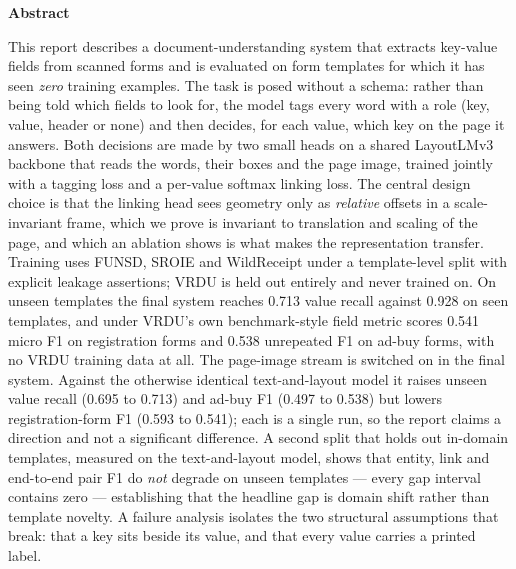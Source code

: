 \documentclass[11pt,a4paper]{article}
\begin{document}
\begin{center}
\begin{minipage}{0.86\textwidth}
\begin{center}\textbf{Abstract}\end{center}
\small
This report describes a document-understanding system that extracts key-value fields from
scanned forms and is evaluated on form templates for which it has seen \emph{zero} training
examples. The task is posed without a schema: rather than being told which fields to look for,
the model tags every word with a role (key, value, header or none) and then decides, for each
value, which key on the page it answers. Both decisions are made by two small heads on a shared LayoutLMv3 backbone that reads the words,
their boxes and the page image, trained jointly with a tagging loss and a per-value softmax
linking loss.
The central design choice is that the linking head sees geometry only as \emph{relative}
offsets in a scale-invariant frame, which we prove is invariant to translation and scaling of
the page, and which an ablation shows is what makes the representation transfer. Training uses
FUNSD, SROIE and WildReceipt under a template-level split with explicit leakage assertions;
VRDU is held out entirely and never trained on. On unseen templates the final system reaches
0.713 value recall against 0.928 on seen templates, and under VRDU's own benchmark-style field
metric scores 0.541 micro F1 on registration forms and 0.538 unrepeated F1 on ad-buy forms, with
no VRDU training data at all. The page-image stream is switched on in the final system. Against
the otherwise identical text-and-layout model it raises unseen value recall (0.695 to 0.713) and
ad-buy F1 (0.497 to 0.538) but lowers registration-form F1 (0.593 to 0.541); each is a single run,
so the report claims a direction and not a significant difference. A second split that holds out
in-domain templates, measured on the text-and-layout model, shows that entity, link and
end-to-end pair F1 do \emph{not} degrade on unseen templates --- every gap interval contains zero
--- establishing that the headline gap is domain shift rather than template novelty. A failure
analysis isolates the two structural assumptions that break: that a key sits beside its
value, and that every value carries a printed label.
\end{minipage}
\end{center}

\vspace{4mm}
\end{document}

